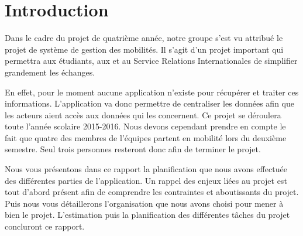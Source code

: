 \chapter*{Introduction}

Dans le cadre du projet de quatrième année, notre groupe s'est vu attribué le projet de système de gestion des mobilités. Il s'agit d'un projet important qui permettra aux étudiants, aux \ris et au Service Relations Internationales de simplifier grandement les échanges. 

En effet, pour le moment aucune application n'existe pour récupérer et traiter ces informations. L'application va donc permettre de centraliser les données afin que les acteurs aient accès aux données qui les concernent. Ce projet se déroulera toute l'année scolaire 2015-2016. Nous devons cependant prendre en compte le fait que quatre des membres de l'équipes partent en mobilité lors du deuxième semestre. Seul trois personnes resteront donc afin de terminer le projet.

\bigbreak

Nous vous présentons dans ce rapport la planification que nous avons effectuée des différentes parties de l'application. Un rappel des enjeux liées au projet est tout d'abord présent afin de comprendre les contraintes et aboutissants du projet. Puis nous vous détaillerons l'organisation que nous avons choisi pour mener à bien le projet. L'estimation puis la planification des différentes tâches du projet concluront ce rapport.